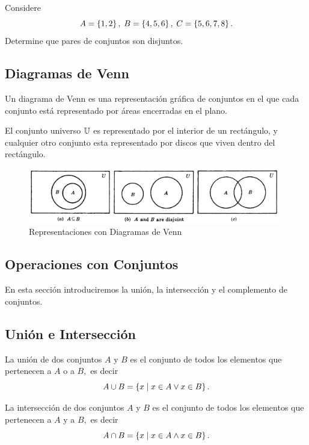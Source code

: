 	\begin{problema}
		Considere $$
		A=\left\{ 1,2 \right\}, \; B=\left\{ 4,5,6 \right\}, \; C=\left\{ 5,6,7,8 \right\}.
		$$
		Determine que pares de conjuntos son disjuntos. 
	\end{problema}
	


\subsection{Diagramas de Venn}


	Un diagrama de Venn es una representación gráfica de conjuntos en el que cada conjunto está representado por áreas encerradas en el plano.



	El conjunto universo $\mathbb{U}$ es representado por el interior de un rectángulo, y cualquier otro conjunto esta representado por discos que viven dentro del rectángulo.



	\begin{figure}
		\centering
		\includegraphics[width=11cm,keepaspectratio=true]{./md/venn01.png}
		\caption{Representaciones con Diagramas de Venn}
		\label{fig:0101}
	\end{figure}
	


\subsection{Operaciones con Conjuntos}


	En esta sección introduciremos la unión, la intersección y el complemento de conjuntos.


\subsection{Unión e Intersección}


	La unión de dos conjuntos $A$ y $B$ es el conjunto de todos los elementos que pertenecen a $A$ o a $B,$  es decir
	$$
	A \cup B = \left\{ x \mid x\in A \vee x\in B \right\}.
	$$



	La intersección de dos conjuntos $A$ y $B$ es el conjunto de todos los elementos que pertenecen a $A$ y a $B,$  es decir
	$$
	A \cap B = \left\{ x \mid x\in A \wedge x\in B \right\}.
	$$



